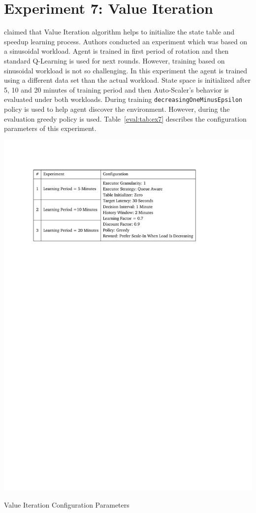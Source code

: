 \clearpage
\section{Experiment 7: Value Iteration}
\textcite{dutreilh:hal-01122123} claimed that Value Iteration algorithm helps to initialize the state table and speedup learning process. Authors conducted an experiment which was based on a sinusoidal workload. Agent is trained in first period of rotation and then standard Q-Learning is used for next rounds. However, training based on sinusoidal workload is not so challenging. In this experiment the agent is trained using a different data set than the actual workload. State space is initialized after 5, 10 and 20 minutes of training period and then Auto-Scaler's behavior is evaluated under both workloads. During training \lstinline|decreasingOneMinusEpsilon| policy is used to help agent discover the environment. However, during the evaluation greedy policy is used. Table~\ref{eval:tab:ex7} describes the configuration parameters of this experiment.
\begin{table}[h]
    \includegraphics[clip,trim=2.4cm 21.18cm 4.65cm 2.5cm]{tables/ex7.pdf}
    \centering
    \caption{Value Iteration Configuration Parameters}
    \label{eval:tab:ex7}
\end{table}


